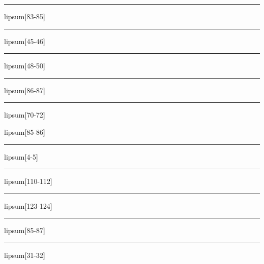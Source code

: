 \documentclass[11pt,a4paper]{article}
\begin{document}
\begin{simplewrap}
  \textcolor{red!40}{\rule{5.0cm}{8.0cm}}
\end{simplewrap}
lipsum[83-85]

\begin{simplewrap}
  \textcolor{blue!59}{\rule{3.3cm}{6.6cm}}
\end{simplewrap}
lipsum[45-46]

\begin{simplewrap}
  \textcolor{cyan!12}{\rule{6.0cm}{5.2cm}}
\end{simplewrap}
lipsum[48-50]

\begin{simplewrap}
  \textcolor{violet!12}{\rule{3.0cm}{6.5cm}}
\end{simplewrap}
lipsum[86-87]

\begin{simplewrap}
  \textcolor{magenta!43}{\rule{4.5cm}{9.5cm}}
\end{simplewrap}
lipsum[70-72]

lipsum[85-86]

\begin{simplewrap}
  \textcolor{cyan!56}{\rule{4.4cm}{4.1cm}}
\end{simplewrap}
lipsum[4-5]

\begin{simplewrap}
  \textcolor{violet!46}{\rule{5.0cm}{3.5cm}}
\end{simplewrap}
lipsum[110-112]

\begin{simplewrap}
  \textcolor{green!35}{\rule{5.0cm}{3.5cm}}
\end{simplewrap}
lipsum[123-124]

\begin{simplewrap}
  \textcolor{magenta!10}{\rule{3.8cm}{3.9cm}}
\end{simplewrap}
lipsum[85-87]

\begin{simplewrap}
  \textcolor{red!26}{\rule{5.0cm}{7.5cm}}
\end{simplewrap}
lipsum[31-32]
\end{document}
